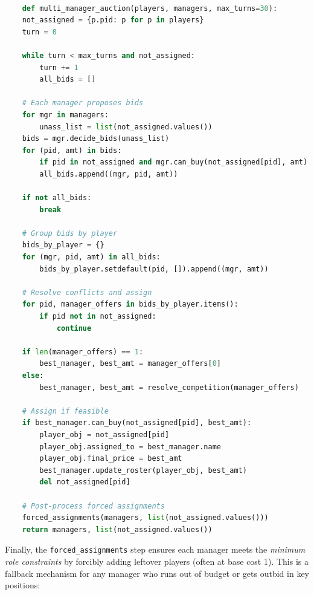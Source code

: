\documentclass[sigconf]{acmart}
\begin{document}
	\begin{lstlisting}[language=Python, caption=Multi-manager auction framework]

	def multi_manager_auction(players, managers, max_turns=30):
	not_assigned = {p.pid: p for p in players}
	turn = 0
	
	while turn < max_turns and not_assigned:
		turn += 1
		all_bids = []
	
	# Each manager proposes bids
	for mgr in managers:
		unass_list = list(not_assigned.values())
	bids = mgr.decide_bids(unass_list)
	for (pid, amt) in bids:
		if pid in not_assigned and mgr.can_buy(not_assigned[pid], amt):
		all_bids.append((mgr, pid, amt))
	
	if not all_bids:
		break
	
	# Group bids by player
	bids_by_player = {}
	for (mgr, pid, amt) in all_bids:
		bids_by_player.setdefault(pid, []).append((mgr, amt))
	
	# Resolve conflicts and assign
	for pid, manager_offers in bids_by_player.items():
		if pid not in not_assigned:
			continue
	
	if len(manager_offers) == 1:
		best_manager, best_amt = manager_offers[0]
	else:
		best_manager, best_amt = resolve_competition(manager_offers)
	
	# Assign if feasible
	if best_manager.can_buy(not_assigned[pid], best_amt):
		player_obj = not_assigned[pid]
		player_obj.assigned_to = best_manager.name
		player_obj.final_price = best_amt
		best_manager.update_roster(player_obj, best_amt)
		del not_assigned[pid]
	
	# Post-process forced assignments
	forced_assignments(managers, list(not_assigned.values()))
	return managers, list(not_assigned.values())
\end{lstlisting}

	
	Finally, the \texttt{forced\_assignments} step ensures each manager meets the \emph{minimum role constraints} by forcibly adding leftover players (often at base cost 1). This is a fallback mechanism for any manager who runs out of budget or gets outbid in key positions:
	
\end{document}
